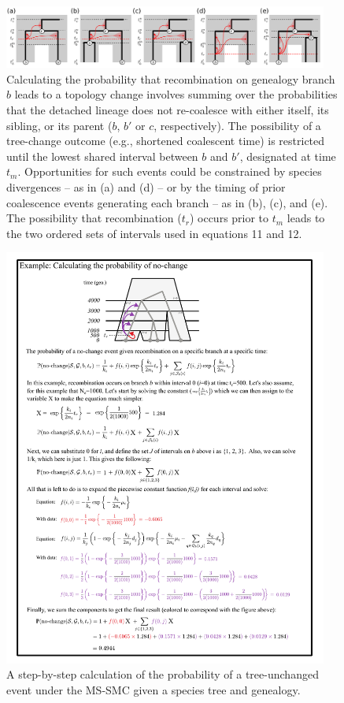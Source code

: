 \documentclass[11pt]{article}
\begin{document}
\begin{figure}[p]
	\centering
	\includegraphics[width=0.95\textwidth]{figures/FigS-tbm.pdf}
	\caption{
		Calculating the probability that recombination on genealogy branch 
		$b$ leads to a topology change involves summing over the probabilities 
		that the detached lineage does not re-coalesce with either
		itself, its sibling, or its parent ($b$, $b'$ or $c$, respectively). 
		The possibility of a tree-change outcome (e.g., shortened coalescent 
		time) is restricted until the lowest shared interval between $b$ and 
		$b'$, designated at time $t_m$. Opportunities for such events could be
		constrained by species divergences -- as in (a) and (d) -- or by the timing of 
		prior coalescence events generating each branch -- as in (b), (c), and (e). 
		The possibility that recombination ($t_r$) occurs prior
		to $t_m$ leads to the two ordered sets of intervals used in 
		equations 11 and 12.
	}
	\label{fig:figS-tbm}
\end{figure}


\begin{figure}[p]
	\centering
	\includegraphics[width=0.95\textwidth]{figures/current/FigS6-equations}
	\caption{A step-by-step calculation of the probability of a tree-unchanged 
	event under the MS-SMC given a species tree and genealogy.
	}
	\label{fig:figS-tree-equations}
\end{figure}
\end{document}
